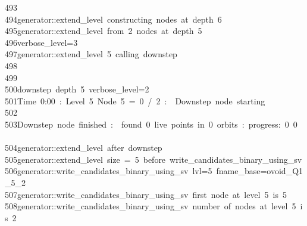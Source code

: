 \begin{tabbing}
493\>\\[0pt]
494\>generator::extend\_level\ constructing\ nodes\ at\ depth\ 6\\[0pt]
495\>generator::extend\_level\ from\ 2\ nodes\ at\ depth\ 5\\[0pt]
496\>verbose\_level=3\\[0pt]
497\>generator::extend\_level\ 5\ calling\ downstep\\[0pt]
498\>\\[0pt]
499\>\\[0pt]
500\>downstep\ depth\ 5\ verbose\_level=2\\[0pt]
501\>Time\ 0:00\ :\ Level\ 5\ Node\ 5\ =\ 0\ /\ 2\ :\ \ Downstep\ node\ starting\\[0pt]
502\>\\[0pt]
503\>Downstep\ node\ finished\ :\ \ found\ 0\ live\ points\ in\ 0\ orbits\ :\ progress:\ 0\ 0\ \ \\[0pt]
504\>generator::extend\_level\ after\ downstep\\[0pt]
505\>generator::extend\_level\ size\ =\ 5\ before\ write\_candidates\_binary\_using\_sv\\[0pt]
506\>generator::write\_candidates\_binary\_using\_sv\ lvl=5\ fname\_base=ovoid\_Q1\_5\_2\\[0pt]
507\>generator::write\_candidates\_binary\_using\_sv\ first\ node\ at\ level\ 5\ is\ 5\\[0pt]
508\>generator::write\_candidates\_binary\_using\_sv\ number\ of\ nodes\ at\ level\ 5\ is\ 2\\[0pt]

\end{tabbing}
